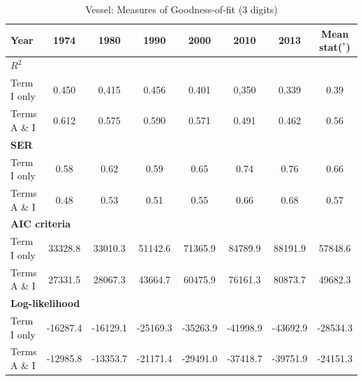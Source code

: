 \documentclass[a4paper,11pt]{article}
\begin{document}
\begin{table}[htbp]
  \centering
  \caption{Vessel: Measures of Goodness-of-fit (3 digits)}
    \footnotesize{
\begin{center}
\begin{tabular}{l|cccccc|c}
\hline \hline
Year  & \multicolumn{1}{c}{1974} & \multicolumn{1}{c}{1980} & \multicolumn{1}{c}{1990} & \multicolumn{1}{c}{2000} & 2010  & \multicolumn{1}{c}{2013} & Mean stat($^{\ast}$) \\ \hline
\multicolumn{8}{l}{\bf{$R^2$} }\\ \hline
Term I only & \multicolumn{1}{c}{0.450} & \multicolumn{1}{c}{0,415} & \multicolumn{1}{c}{0.456} & \multicolumn{1}{c}{0.401} & 0,350 & \multicolumn{1}{c}{0.339} & 0.39 \\
Terms A \& I & \multicolumn{1}{c}{0.612} & \multicolumn{1}{c}{0.575} & \multicolumn{1}{c}{0.590} & \multicolumn{1}{c}{0.571} & 0.491 & \multicolumn{1}{c}{0.462} & 0.56 \\ \hline
\multicolumn{8}{l}{\textbf{SER}  }  \\ \hline
    Term I only & \multicolumn{1}{c}{0.58} & \multicolumn{1}{c}{0.62} & \multicolumn{1}{c}{0.59} & \multicolumn{1}{c}{0.65} & 0.74  & \multicolumn{1}{c}{0.76} & 0.66 \\
    Terms A \& I & \multicolumn{1}{c}{0.48} & \multicolumn{1}{c}{0.53} & \multicolumn{1}{c}{0.51} & \multicolumn{1}{c}{0.55} & 0.66  & \multicolumn{1}{c}{0.68} & 0.57 \\ \hline
   \multicolumn{8}{l}{\textbf{AIC criteria}}  \\ \hline
    Term I only & \multicolumn{1}{c}{33328.8} & \multicolumn{1}{c}{33010.3} & \multicolumn{1}{c}{51142.6} & \multicolumn{1}{c}{71365.9} & 84789.9 & \multicolumn{1}{c}{88191.9} & 57848.6 \\
    Terms A \& I & \multicolumn{1}{c}{27331.5} & \multicolumn{1}{c}{28067.3} & \multicolumn{1}{c}{43664.7} & \multicolumn{1}{c}{60475.9} & 76161.3 & \multicolumn{1}{c}{80873.7} & 49682.3 \\ \hline
    \multicolumn{8}{l}{\textbf{Log-likelihood}} \\ \hline
    Term I only & \multicolumn{1}{c}{-16287.4} & \multicolumn{1}{c}{-16129.1} & \multicolumn{1}{c}{-25169.3} & \multicolumn{1}{c}{-35263.9} & -41998.9 & \multicolumn{1}{c}{-43692.9} & -28534.3 \\
    Terms A \& I & \multicolumn{1}{c}{-12985.8} & \multicolumn{1}{c}{-13353.7} & \multicolumn{1}{c}{-21171.4} & \multicolumn{1}{c}{-29491.0} & -37418.7 & \multicolumn{1}{c}{-39751.9} & -24151.3 \\

\end{tabular}
\end{center}}
\end{table}
\end{document}
